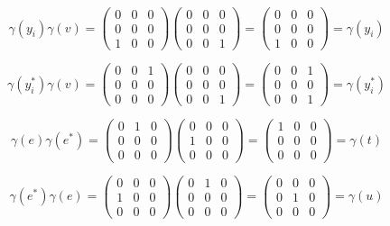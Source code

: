 \begin{solution}
    $$\gamma(y_i)\gamma(v)=\left(\begin{array}{ccc} 0 & 0 & 0 \\ 0 & 0 & 0 \\ 1 & 0 & 0 \end{array}\right)
    \left(\begin{array}{ccc} 0 & 0 & 0 \\ 0 & 0 & 0 \\ 0 & 0 & 1 \end{array}\right)
    =\left(\begin{array}{ccc} 0 & 0 & 0 \\ 0 & 0 & 0 \\ 1 & 0 & 0 \end{array}\right)=\gamma(y_i)$$

    $$\gamma(y_i^*)\gamma(v)=\left(\begin{array}{ccc} 0 & 0 & 1 \\ 0 & 0 & 0 \\ 0 & 0 & 0 \end{array}\right)
    \left(\begin{array}{ccc} 0 & 0 & 0 \\ 0 & 0 & 0 \\ 0 & 0 & 1 \end{array}\right)
    =\left(\begin{array}{ccc} 0 & 0 & 1 \\ 0 & 0 & 0 \\ 0 & 0 & 1 \end{array}\right)=\gamma(y_i^*)$$

    $$\gamma(e)\gamma(e^*)=\left(\begin{array}{ccc} 0 & 1 & 0 \\ 0 & 0 & 0 \\ 0 & 0 & 0 \end{array}\right)
    \left(\begin{array}{ccc} 0 & 0 & 0 \\ 1 & 0 & 0 \\ 0 & 0 & 0 \end{array}\right)
    =\left(\begin{array}{ccc} 1 & 0 & 0 \\ 0 & 0 & 0 \\ 0 & 0 & 0 \end{array}\right)=\gamma(t)$$

    $$\gamma(e^*)\gamma(e)=\left(\begin{array}{ccc} 0 & 0 & 0 \\ 1 & 0 & 0 \\ 0 & 0 & 0 \end{array}\right)
    \left(\begin{array}{ccc} 0 & 1 & 0 \\ 0 & 0 & 0 \\ 0 & 0 & 0 \end{array}\right)
    =\left(\begin{array}{ccc} 0 & 0 & 0 \\ 0 & 1 & 0 \\ 0 & 0 & 0 \end{array}\right)=\gamma(u)$$


\end{solution}
